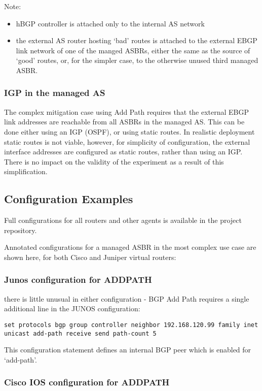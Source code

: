 Note:
\begin{itemize}
    \item hBGP controller is attached only to the internal AS network
    \item the external AS router hosting `bad' routes is attached to the external EBGP link network of one of the manged ASBRs, either the same as the source of `good' routes, or, for the simpler case, to the otherwise unused third managed ASBR.
\end{itemize}

\subsubsection{IGP in the managed AS}
The complex mitigation case using Add Path requires that the external EBGP link addresses are reachable from all ASBRs in the managed AS.  This can be done either using an IGP (OSPF), or using static routes.  In realistic deployment static routes is not viable, however, for simplicity of configuration, the external interface addresses are configured as static routes, rather than using an IGP.  There is no impact on the validity of the experiment as a result of this simplification.

\subsection{Configuration Examples}

Full configurations for all routers and other agents is available in the project repository.

Annotated configurations for a managed ASBR in the most complex use case are shown here, for both Cisco and Juniper virtual routers:

\subsubsection{Junos configuration for ADDPATH}
there is little unusual in either configuration - BGP Add Path requires a single additional line in the JUNOS configuration:

\begin{verbatim}
set protocols bgp group controller neighbor 192.168.120.99 family inet unicast add-path receive send path-count 5
\end{verbatim}
This configuration statement defines an internal BGP peer which is enabled for `add-path'.

\subsubsection{Cisco IOS configuration for ADDPATH}

